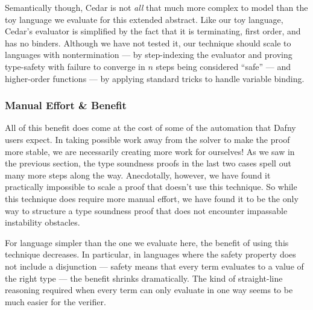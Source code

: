\documentclass[sigplan,review,screen,anonymous]{acmart}
\begin{document}
Semantically though, Cedar is not \emph{all} that much more complex to model than the
toy language we evaluate for this extended abstract. Like our toy language,
Cedar's evaluator is simplified by the fact that it is terminating, first order, and has no binders.  Although we have not tested it, our
technique should scale to languages with nontermination --- by step-indexing the
evaluator and proving type-safety with failure to converge in $n$ steps being
considered ``safe'' \cite{step-indexing} --- and higher-order functions ---
by applying standard tricks to handle variable binding.


\subsubsection*{Manual Effort \& Benefit}
All of this benefit does come at the cost of some of the automation that Dafny
users expect. In taking possible work away from the solver to make the proof
more stable, we are necessarily creating more work for ourselves!  As we saw in
the previous section, the type soundness proofs in the last two cases spell out
many more steps along the way. Anecdotally, however, we have found it practically impossible
to scale a proof that doesn't use this technique. So while this technique does require more manual effort,
we have found it to be the only way to structure a type soundness proof that does not encounter impassable instability obstacles.

For language simpler than the one we evaluate here, the benefit of using this technique decreases. In particular, in languages
where the safety property does not include a disjunction --- safety means that every term evaluates to a value of the right type ---
the benefit shrinks dramatically. The kind of straight-line reasoning required when every term can only evaluate in one way seems to be
much easier for the verifier.






\end{document}
